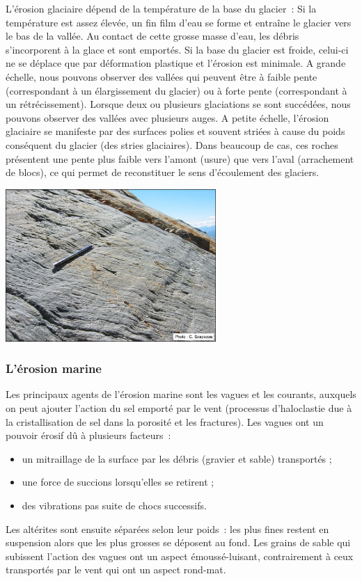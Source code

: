 \documentclass[a4paper,11pt]{article}
\begin{document}
L'érosion glaciaire dépend de la température de la base du glacier~:
Si la température est assez élevée, un fin film d'eau se forme et entraîne le glacier vers le bas de la vallée. Au contact de cette grosse masse d'eau, les débris s'incorporent à la glace et sont emportés.
Si la base du glacier est froide, celui-ci ne se déplace que par déformation plastique et l'érosion est minimale.
A grande échelle, nous pouvons observer des vallées qui peuvent être à faible pente (correspondant à un élargissement du glacier) ou à forte pente (correspondant à un rétrécissement).
Lorsque deux ou plusieurs glaciations se sont succédées, nous pouvons observer des vallées avec plusieurs auges. 
A petite échelle, l'érosion glaciaire se manifeste par des surfaces polies et souvent striées à cause du poids conséquent du glacier (des stries glaciaires).
Dans beaucoup de cas, ces roches présentent une pente plus faible vers l'amont (usure) que vers l'aval (arrachement de blocs), ce qui permet de reconstituer le sens d'écoulement des glaciers.

\begin{center}
  \includegraphics[width=8cm]{Images/Erosion/stries_glaciaires.jpg}
\end{center}

\subsubsection{L'érosion marine}

Les principaux agents de l'érosion marine sont les vagues et les courants, auxquels on peut ajouter l'action du sel emporté par le vent (processus d'haloclastie due à la cristallisation de sel dans la porosité et les fractures).
Les vagues ont un pouvoir érosif dû à plusieurs facteurs~:
\begin{itemize}
  \item un mitraillage de la surface par les débris (gravier et sable) transportés ;
  \item une force de succions lorsqu'elles se retirent ;
  \item des vibrations pas suite de chocs successifs.
\end{itemize}
Les altérites sont ensuite séparées selon leur poids~: les plus fines restent en suspension alors que les plus grosses se déposent au fond.
Les grains de sable qui subissent l'action des vagues ont un aspect émoussé-luisant, contrairement à ceux transportés par le vent qui ont un aspect rond-mat. \\
\end{document}
